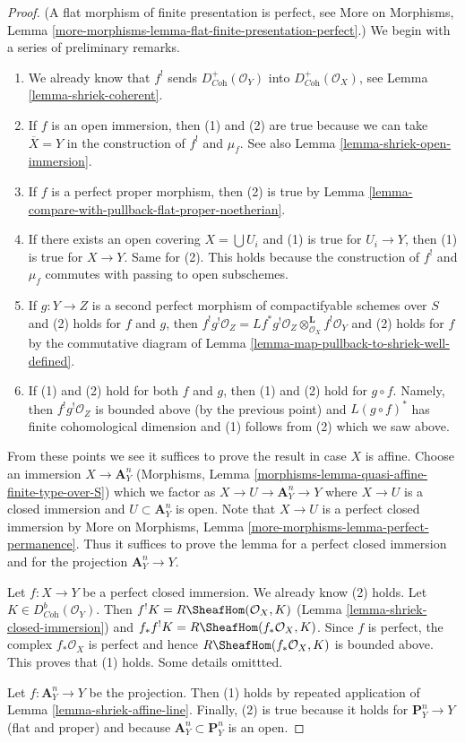 \begin{proof}
(A flat morphism of finite presentation is perfect, see
More on Morphisms, Lemma
\ref{more-morphisms-lemma-flat-finite-presentation-perfect}.)
We begin with a series of preliminary remarks.
\begin{enumerate}
\item We already know that $f^!$ sends $D_{\textit{Coh}}^+(\mathcal{O}_Y)$
into $D_{\textit{Coh}}^+(\mathcal{O}_X)$, see
Lemma \ref{lemma-shriek-coherent}.
\item If $f$ is an open immersion, then (1) and (2) are true because
we can take $\overline{X} = Y$ in the construction of $f^!$ and $\mu_f$.
See also Lemma \ref{lemma-shriek-open-immersion}.
\item If $f$ is a perfect proper morphism, then (2) is true by
Lemma \ref{lemma-compare-with-pullback-flat-proper-noetherian}.
\item If there exists an open covering $X = \bigcup U_i$ and (1) is
true for $U_i \to Y$, then (1) is true for $X \to Y$. Same for (2).
This holds because the construction of $f^!$ and $\mu_f$ commutes
with passing to open subschemes.
\item If $g : Y \to Z$ is a second perfect morphism of compactifyable
schemes over $S$ and (2) holds for $f$ and $g$, then
$f^!g^!\mathcal{O}_Z =
Lf^*g^!\mathcal{O}_Z \otimes_{\mathcal{O}_X}^\mathbf{L} f^!\mathcal{O}_Y$
and (2) holds for $f$ by the commutative diagram
of Lemma \ref{lemma-map-pullback-to-shriek-well-defined}.
\item If (1) and (2) hold for both $f$ and $g$, then
(1) and (2) hold for $g \circ f$. Namely, then $f^!g^!\mathcal{O}_Z$
is bounded above (by the previous point) and $L(g \circ f)^*$ has finite
cohomological dimension and (1) follows from (2) which we saw above.
\end{enumerate}
From these points we see it suffices to prove the result in case $X$ is affine.
Choose an immersion $X \to \mathbf{A}^n_Y$
(Morphisms, Lemma \ref{morphisms-lemma-quasi-affine-finite-type-over-S})
which we factor as $X \to U \to \mathbf{A}^n_Y \to Y$ where $X \to U$
is a closed immersion and $U \subset \mathbf{A}^n_Y$ is open.
Note that $X \to U$ is a perfect closed immersion by
More on Morphisms, Lemma \ref{more-morphisms-lemma-perfect-permanence}.
Thus it suffices to prove the lemma for a perfect closed immersion
and for the projection $\mathbf{A}^n_Y \to Y$.

\medskip\noindent
Let $f : X \to Y$ be a perfect closed immersion. We already know (2) holds.
Let $K \in D^b_{\textit{Coh}}(\mathcal{O}_Y)$.
Then $f^!K = R\SheafHom(\mathcal{O}_X, K)$
(Lemma \ref{lemma-shriek-closed-immersion})
and $f_*f^!K = R\SheafHom(f_*\mathcal{O}_X, K)$.
Since $f$ is perfect, the complex $f_*\mathcal{O}_X$ is perfect
and hence $R\SheafHom(f_*\mathcal{O}_X, K)$ is bounded above.
This proves that (1) holds. Some details omittted.

\medskip\noindent
Let $f : \mathbf{A}^n_Y \to Y$ be the projection. Then (1) holds
by repeated application of Lemma \ref{lemma-shriek-affine-line}.
Finally, (2) is true because it holds for $\mathbf{P}^n_Y \to Y$
(flat and proper) and because $\mathbf{A}^n_Y \subset \mathbf{P}^n_Y$
is an open.
\end{proof}

